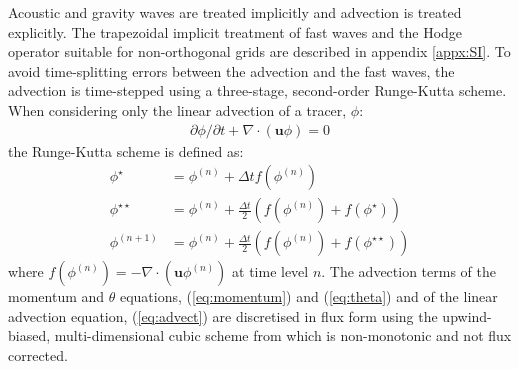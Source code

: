 Acoustic and gravity waves are treated implicitly and advection is treated explicitly. The trapezoidal implicit treatment of fast waves and the Hodge operator suitable for non-orthogonal grids are described in appendix \ref{appx:SI}. To avoid time-splitting errors between the advection and the fast waves, the advection is time-stepped using a three-stage, second-order Runge-Kutta scheme. When considering only the linear advection of a tracer, $\phi$:
\begin{align}
\partial \phi / \partial t + \nabla \cdot \left( \mathbf{u} \phi \right) = 0
\label{eq:advect}
\end{align}
the Runge-Kutta scheme is defined as:
\begin{subequations}
\begin{align}
	\phi^\star &= \phi^{(n)} + \Delta t f(\phi^{(n)}) \\
	\phi^{\star\star} &= \phi^{(n)} + \frac{\Delta t}{2} \left( f(\phi^{(n)}) + f(\phi^\star) \right) \\
	\phi^{(n+1)} &= \phi^{(n)} + \frac{\Delta t}{2} \left( f(\phi^{(n)}) + f(\phi^{\star\star}) \right)
\end{align}
\end{subequations}
where \(f(\phi^{(n)}) = - \nabla \cdot (\mathbf{u} \phi^{(n)})\) at time level \(n\). The advection terms of the momentum and $\theta$ equations, (\ref{eq:momentum}) and (\ref{eq:theta}) and of the linear advection equation, (\ref{eq:advect}) are discretised in flux form using the upwind-biased, multi-dimensional cubic scheme from \citet{weller-shahrokhi2014} which is non-monotonic and not flux corrected.

